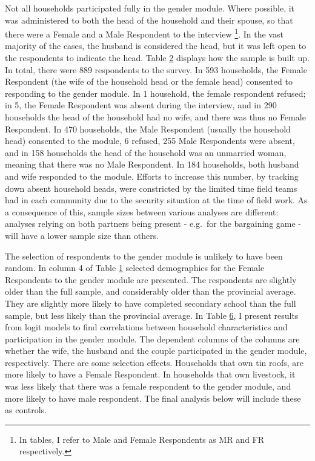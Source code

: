 \documentclass[
]{article}
\begin{document}
Not all households participated fully in the gender module. Where
possible, it was administered to both the head of the household and
their spouse, so that there were a Female and a Male Respondent to the
interview \footnote{In tables, I refer to Male and Female Respondents as
  MR and FR respectively.}. In the vast majority of the cases, the
husband is considered the head, but it was left open to the respondents
to indicate the head. Table \hyperref[tab:bargsample]{2} displays how
the sample is built up. In total, there were 889 respondents to the
survey. In 593 households, the Female Respondent (the wife of the
household head or the female head) consented to responding to the gender
module. In 1 household, the female respondent refused; in 5, the Female
Respondent was absent during the interview, and in 290 households the
head of the household had no wife, and there was thus no Female
Respondent. In 470 households, the Male Respondent (usually the
household head) consented to the module, 6 refused, 255 Male Respondents
were absent, and in 158 households the head of the household was an
unmarried woman, meaning that there was no Male Respondent. In 184
households, both husband and wife responded to the module. Efforts to
increase this number, by tracking down absent household heads, were
constricted by the limited time field teams had in each community due to
the security situation at the time of field work. As a consequence of
this, sample sizes between various analyses are different: analyses
relying on both partners being present - e.g.~for the bargaining game -
will have a lower sample size than others.

The selection of respondents to the gender module is unlikely to have
been random. In column 4 of Table \hyperref[tab:dhs_compare]{1} selected
demographics for the Female Respondents to the gender module are
presented. The respondents are slightly older than the full sample, and
considerably older than the provincial average. They are slightly more
likely to have completed secondary school than the full sample, but less
likely than the provincial average. In Table
\hyperref[tab:sample_selection]{6}, I present results from logit models
to find correlations between household characteristics and participation
in the gender module. The dependent columns of the columns are whether
the wife, the husband and the couple participated in the gender module,
respectively. There are some selection effects. Households that own tin
roofs, are more likely to have a Female Respondent. In households that
own livestock, it was less likely that there was a female respondent to
the gender module, and more likely to have male respondent. The final
analysis below will include these as controls.
\end{document}
